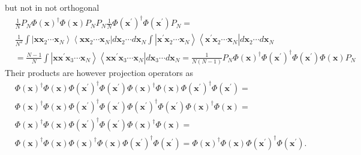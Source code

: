 \documentclass[aps,preprint]{revtex4}%
\begin{document}
but not in not orthogonal
\begin{align}
&  \frac{1}{N}P_{N}\Phi\left(  \mathbf{x}\right)  ^{\dagger}\Phi\left(
\mathbf{x}\right)  P_{N}P_{N}\frac{1}{N}\Phi\left(  \mathbf{x}^{\prime
}\right)  ^{\dagger}\Phi\left(  \mathbf{x}^{\prime}\right)  P_{N}=\nonumber\\
&  \frac{1}{N^{2}}\int\left\vert \mathbf{xx}_{2}\cdots\mathbf{x}%
_{N}\right\rangle \left\langle \mathbf{xx}_{2}\cdots\mathbf{x}_{N}\right\vert
d\mathbf{x}_{2}\cdots d\mathbf{x}_{N}\int\left\vert \mathbf{x}^{\prime
}\mathbf{x}_{2}\cdots\mathbf{x}_{N}\right\rangle \left\langle \mathbf{x}%
^{\prime}\mathbf{x}_{2}\cdots\mathbf{x}_{N}\right\vert d\mathbf{x}_{2}\cdots
d\mathbf{x}_{N}\nonumber\\
&  =\frac{N-1}{N}\int\left\vert \mathbf{x\mathbf{x}^{\prime}x}_{3}%
\cdots\mathbf{x}_{N}\right\rangle \left\langle \mathbf{x\mathbf{x}^{\prime}%
x}_{3}\cdots\mathbf{x}_{N}\right\vert d\mathbf{x}_{3}\cdots d\mathbf{x}%
_{N}=\frac{1}{N\left(  N-1\right)  }P_{N}\Phi\left(  \mathbf{x}\right)
^{\dagger}\Phi\left(  \mathbf{x}^{\prime}\right)  ^{\dagger}\Phi\left(
\mathbf{x}^{\prime}\right)  \Phi\left(  \mathbf{x}\right)  P_{N}%
\end{align}
Their products are however projection operators as
\begin{align}
&  \Phi\left(  \mathbf{x}\right)  ^{\dagger}\Phi\left(  \mathbf{x}\right)
\Phi\left(  \mathbf{x}^{\prime}\right)  ^{\dagger}\Phi\left(  \mathbf{x}%
^{\prime}\right)  \Phi\left(  \mathbf{x}\right)  ^{\dagger}\Phi\left(
\mathbf{x}\right)  \Phi\left(  \mathbf{x}^{\prime}\right)  ^{\dagger}%
\Phi\left(  \mathbf{x}^{\prime}\right)  =\nonumber\\
&  \Phi\left(  \mathbf{x}\right)  ^{\dagger}\Phi\left(  \mathbf{x}\right)
\Phi\left(  \mathbf{x}^{\prime}\right)  ^{\dagger}\Phi\left(  \mathbf{x}%
^{\prime}\right)  \Phi\left(  \mathbf{x}^{\prime}\right)  ^{\dagger}%
\Phi\left(  \mathbf{x}^{\prime}\right)  \Phi\left(  \mathbf{x}\right)
^{\dagger}\Phi\left(  \mathbf{x}\right)  =\nonumber\\
&  \Phi\left(  \mathbf{x}\right)  ^{\dagger}\Phi\left(  \mathbf{x}\right)
\Phi\left(  \mathbf{x}^{\prime}\right)  ^{\dagger}\Phi\left(  \mathbf{x}%
^{\prime}\right)  \Phi\left(  \mathbf{x}\right)  ^{\dagger}\Phi\left(
\mathbf{x}\right)  =\nonumber\\
&  \Phi\left(  \mathbf{x}\right)  ^{\dagger}\Phi\left(  \mathbf{x}\right)
\Phi\left(  \mathbf{x}\right)  ^{\dagger}\Phi\left(  \mathbf{x}\right)
\Phi\left(  \mathbf{x}^{\prime}\right)  ^{\dagger}\Phi\left(  \mathbf{x}%
^{\prime}\right)  =\Phi\left(  \mathbf{x}\right)  ^{\dagger}\Phi\left(
\mathbf{x}\right)  \Phi\left(  \mathbf{x}^{\prime}\right)  ^{\dagger}%
\Phi\left(  \mathbf{x}^{\prime}\right)  .
\end{align}
\end{document}
